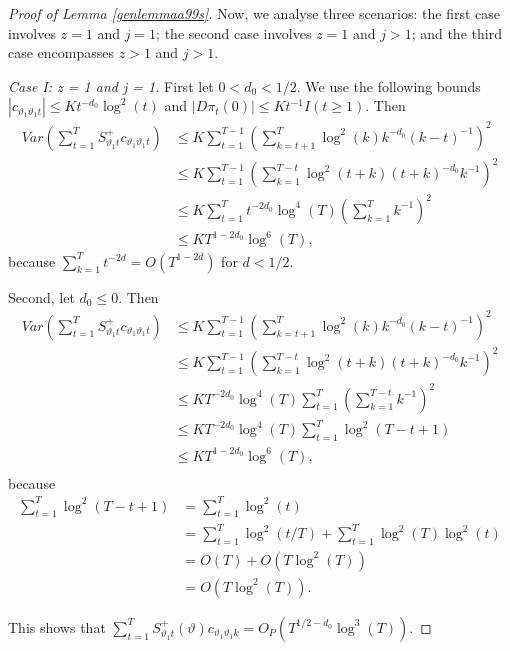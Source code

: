 {{\begin{proof}[Proof of Lemma \ref{genlemmaa99s}]
Now, we analyse three scenarios: the first case involves $z = 1$ and $j = 1$; the second case involves $z = 1$ and $j>1$; and the third case encompasses $z>1$ and $j > 1$.


\textit{Case I: z = 1 and j = 1.} First let $0 < d_0 < 1/2$. We use the following bounds $|c_{\vartheta_1 \vartheta_1 t}| \leq K t^{-d_0} \log^2(t)$ and $|D\pi_{t}(0)| \leq Kt^{-1} I(t \geq 1)$. Then 
\begin{align*}
    Var(\sum_{t = 1}^{T} S_{\vartheta_1 t}^+ c_{\vartheta_1 \vartheta_1 t}) &\leq K \sum_{t = 1}^{T-1} \left( \sum_{k =t+1}^T \log^2(k)k^{-d_0}  (k-t)^{-1} \right)^2 \\  
    &\leq K \sum_{t = 1}^{T-1} \left( \sum_{k = 1}^{T-t} \log^2(t+k) (t+k)^{-d_0}  k^{-1} \right)^2 \\  
    &\leq K \sum_{t = 1}^{T} t^{-2d_0} \log^4(T) \left( \sum_{k = 1}^{T}   k^{-1} \right)^2 \\ 
    &\leq K T^{1-2d_0} \log^6(T),
\end{align*}
because $\sum_{k = 1}^{T}   t^{-2d} = O(T^{1-2d})$ for $d< 1/2$. 

Second, let $d_0 \leq 0$. Then 
\begin{align*}
    Var(\sum_{t = 1}^{T} S_{\vartheta_1 t}^+ c_{\vartheta_1 \vartheta_1 t}) &\leq K \sum_{t = 1}^{T-1} \left( \sum_{k =t+1}^T \log^2(k)k^{-d_0}  (k-t)^{-1} \right)^2 \\  
    &\leq K \sum_{t = 1}^{T-1} \left( \sum_{k = 1}^{T-t} \log^2(t+k) (t+k)^{-d_0}  k^{-1} \right)^2 \\  
    &\leq K  T^{-2d_0}   \log^4(T) \sum_{t = 1}^{T} \left( \sum_{k = 1}^{T-t}   k^{-1} \right)^2 \\ 
    &\leq K  T^{-2d_0}   \log^4(T) \sum_{t = 1}^{T} \log^2(T-t+1) \\
     &\leq K  T^{1-2d_0}   \log^6(T), \\
\end{align*}
because 
\begin{align*}
     \sum_{t = 1}^{T} \log^2(T-t+1) &= \sum_{t = 1}^{T} \log^2(t) \\
                                &= \sum_{t = 1}^{T} \log^2(t/T) +  \sum_{t = 1}^{T} \log^2(T) \log^2(t)\\
                                &= O(T) + O(T\log^2(T)) \\
                                &= O(T\log^2(T)).
\end{align*}


This shows that $\sum_{t = 1}^{T} S_{\vartheta_1 t}^+(\vartheta)  c_{\vartheta_1 \vartheta_1 k} = O_P(T^{1/2-d_0} \log^3(T)) $.


\end{proof}}}
